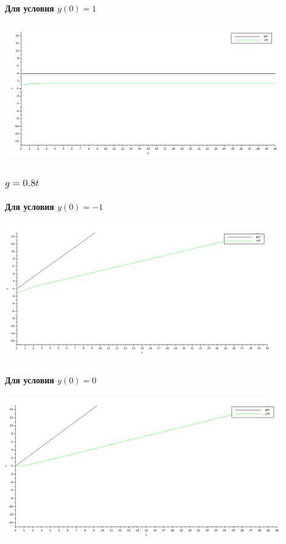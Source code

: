 \documentclass[12pt, a4paper] {ncc}
\begin{document}
\paragraph{Для условия $y(0) = 1$}
\begin{center}
\includegraphics[width=0.9\textwidth]{g1.png}
\end{center}

\subsubsection{$g = 0.8t$}
\paragraph{Для условия $y(0) = -1$}
\begin{center}
\includegraphics[width=0.9\textwidth]{2g-1.png}
\end{center}

\paragraph{Для условия $y(0) = 0$}
\begin{center}
\includegraphics[width=0.9\textwidth]{2g0.png}
\end{center}
\end{document}
